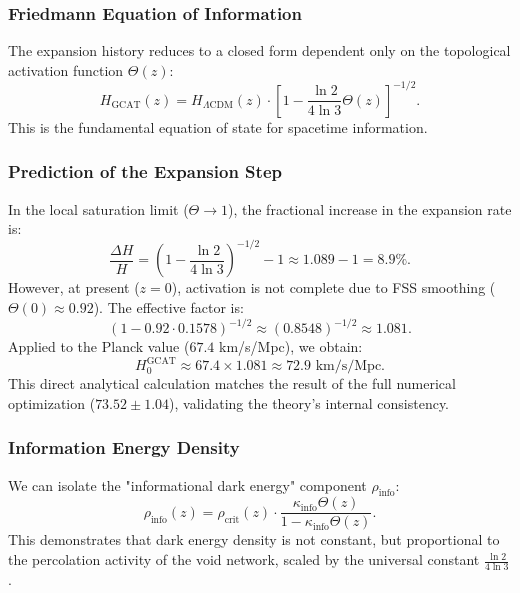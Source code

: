 \documentclass[12pt, a4paper]{article}
\theoremstyle{plain}
\theoremstyle{definition}
\begin{document}
\subsubsection{Friedmann Equation of Information}
The expansion history reduces to a closed form dependent only on the topological activation function $\Theta(z)$:
\begin{equation}
H_{\text{GCAT}}(z) = H_{\Lambda\text{CDM}}(z) \cdot \left[ 1 - \frac{\ln 2}{4\ln 3} \Theta(z) \right]^{-1/2}.
\end{equation}
This is the fundamental equation of state for spacetime information.

\subsubsection{Prediction of the Expansion Step}
In the local saturation limit ($\Theta \to 1$), the fractional increase in the expansion rate is:
\begin{equation}
\frac{\Delta H}{H} = \left( 1 - \frac{\ln 2}{4\ln 3} \right)^{-1/2} - 1 \approx 1.089 - 1 = 8.9\%.
\end{equation}
However, at present ($z=0$), activation is not complete due to FSS smoothing ($\Theta(0) \approx 0.92$). The effective factor is:
\begin{equation}
\left( 1 - 0.92 \cdot 0.1578 \right)^{-1/2} \approx (0.8548)^{-1/2} \approx 1.081.
\end{equation}
Applied to the Planck value ($67.4$ km/s/Mpc), we obtain:
\begin{equation}
H_0^{\text{GCAT}} \approx 67.4 \times 1.081 \approx 72.9 \text{ km/s/Mpc}.
\end{equation}
This direct analytical calculation matches the result of the full numerical optimization ($73.52 \pm 1.04$), validating the theory's internal consistency.

\subsubsection{Information Energy Density}
We can isolate the "informational dark energy" component $\rho_{\text{info}}$:
\begin{equation}
\rho_{\text{info}}(z) = \rho_{\text{crit}}(z) \cdot \frac{\kappa_{\text{info}} \Theta(z)}{1 - \kappa_{\text{info}} \Theta(z)}.
\end{equation}
This demonstrates that dark energy density is not constant, but proportional to the percolation activity of the void network, scaled by the universal constant $\frac{\ln 2}{4\ln 3}$.
\end{document}

